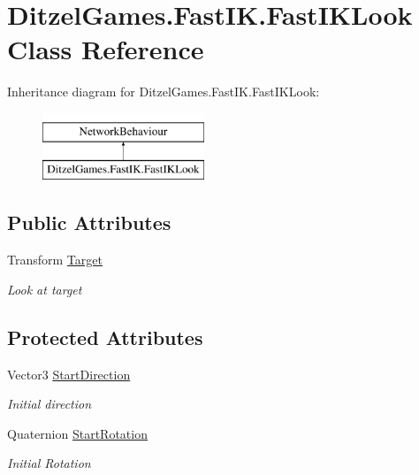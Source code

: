 \hypertarget{class_ditzel_games_1_1_fast_i_k_1_1_fast_i_k_look}{}\section{Ditzel\+Games.\+Fast\+I\+K.\+Fast\+I\+K\+Look Class Reference}
\label{class_ditzel_games_1_1_fast_i_k_1_1_fast_i_k_look}
Inheritance diagram for Ditzel\+Games.\+Fast\+I\+K.\+Fast\+I\+K\+Look\+:\begin{figure}[H]
\begin{center}
\leavevmode
\includegraphics[height=2.000000cm]{class_ditzel_games_1_1_fast_i_k_1_1_fast_i_k_look}
\end{center}
\end{figure}
\subsection*{Public Attributes}
\begin{DoxyCompactItemize}
\item 
Transform \mbox{\hyperlink{class_ditzel_games_1_1_fast_i_k_1_1_fast_i_k_look_af51e777803a90152c88eadac0fa870d4}{Target}}
\begin{DoxyCompactList}\small\item\em Look at target \end{DoxyCompactList}\end{DoxyCompactItemize}
\subsection*{Protected Attributes}
\begin{DoxyCompactItemize}
\item 
Vector3 \mbox{\hyperlink{class_ditzel_games_1_1_fast_i_k_1_1_fast_i_k_look_ad770f652ea0905d5152a8be780742be1}{Start\+Direction}}
\begin{DoxyCompactList}\small\item\em Initial direction \end{DoxyCompactList}\item 
Quaternion \mbox{\hyperlink{class_ditzel_games_1_1_fast_i_k_1_1_fast_i_k_look_ae5fbaad862e035baf3cc8137e4685de0}{Start\+Rotation}}
\begin{DoxyCompactList}\small\item\em Initial Rotation \end{DoxyCompactList}\end{DoxyCompactItemize}


